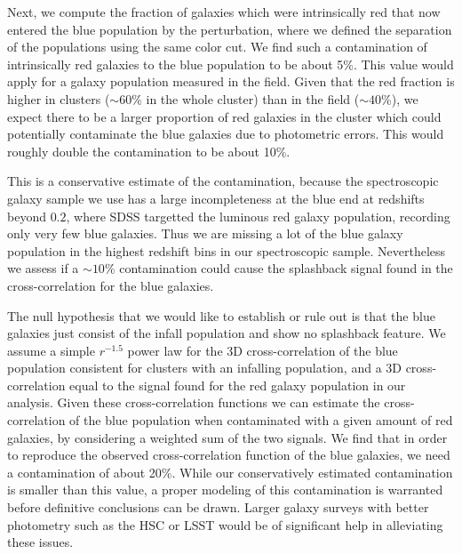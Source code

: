 \documentclass[iop, apjl, twocolappendix, numberedappendix]{emulateapj}
\begin{document}
Next, we compute the fraction of galaxies which were intrinsically red
that now entered the blue population by the perturbation, where we
defined the separation of the populations using the same color
cut. We find such a contamination of intrinsically red galaxies to
the blue population to be about 5\%. This value would apply for a galaxy population
measured in the field. Given that the red fraction is higher in clusters ($\sim
60$\% in the whole cluster) than in the field ($\sim 40$\%),
we expect there to be a larger proportion of red galaxies in the cluster which could
potentially contaminate the blue galaxies due to photometric errors.
This would roughly double the contamination to be about 10\%.

This is a conservative estimate of the contamination, because the
spectroscopic galaxy sample we use has a large incompleteness at the
blue end at redshifts beyond $0.2$, where SDSS targetted the luminous
red galaxy population, recording only very few blue galaxies. 
Thus we are missing a lot of the blue galaxy
population in the highest redshift bins in our spectroscopic sample.
Nevertheless we assess if a $\sim 10$\% contamination could
cause the splashback signal found in the cross-correlation for the blue galaxies.


The null hypothesis that we would like to establish or rule out is
that the blue galaxies just consist of the infall population and show
no splashback feature. We assume a simple $r^{-1.5}$ power law for the
3D cross-correlation of the blue population consistent for clusters with
an infalling population, and a 3D cross-correlation equal to the signal
found for the red galaxy population in our analysis. Given these
cross-correlation functions we can estimate the cross-correlation of
the blue population when contaminated with a given amount of red
galaxies, by considering a weighted sum of the two signals. 
We find that in order to reproduce the observed
cross-correlation function of the blue galaxies, we need a contamination
of about 20\%. While our conservatively estimated contamination is
smaller than this value, a proper modeling of this contamination is
warranted before definitive conclusions can be drawn. Larger galaxy
surveys with better photometry such as the HSC or LSST would be of
significant help in alleviating these issues.
\end{document}

